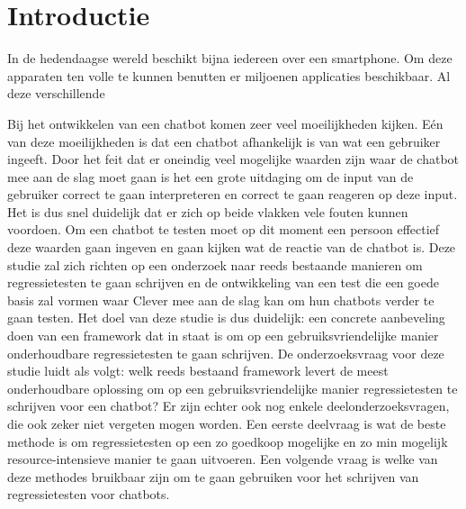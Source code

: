 
\section{Introductie} %
\label{sec:introductie}

In de hedendaagse wereld beschikt bijna iedereen over een smartphone. Om deze apparaten ten volle te kunnen benutten er miljoenen applicaties beschikbaar. Al deze verschillende 

Bij het ontwikkelen van een chatbot komen zeer veel moeilijkheden kijken. Eén van deze moeilijkheden is dat een chatbot afhankelijk is van wat een gebruiker ingeeft. Door het feit dat er oneindig veel mogelijke waarden zijn waar de chatbot mee aan de slag moet gaan is het een grote uitdaging om de input van de gebruiker correct te gaan interpreteren en correct te gaan reageren op deze input. Het is dus snel duidelijk dat er zich op beide vlakken vele fouten kunnen voordoen. Om een chatbot te testen moet op dit moment een persoon effectief deze waarden gaan ingeven en gaan kijken wat de reactie van de chatbot is. Deze studie zal zich richten op een onderzoek naar reeds bestaande manieren om regressietesten te gaan schrijven en de ontwikkeling van een test die een goede basis zal vormen waar Clever mee aan de slag kan om hun chatbots verder te gaan testen. Het doel van deze studie is dus duidelijk: een concrete aanbeveling doen van een framework dat in staat is om op een gebruiksvriendelijke manier onderhoudbare regressietesten te gaan schrijven. De onderzoeksvraag voor deze studie luidt als volgt: welk reeds bestaand framework levert de meest onderhoudbare oplossing om op een gebruiksvriendelijke manier regressietesten te schrijven voor een chatbot? Er zijn echter ook nog enkele deelonderzoeksvragen, die ook zeker niet vergeten mogen worden. Een eerste deelvraag is wat de beste methode is om regressietesten op een zo goedkoop mogelijke en zo min mogelijk resource-intensieve manier te gaan uitvoeren. Een volgende vraag is welke van deze methodes bruikbaar zijn om te gaan gebruiken voor het schrijven van regressietesten voor chatbots. 


